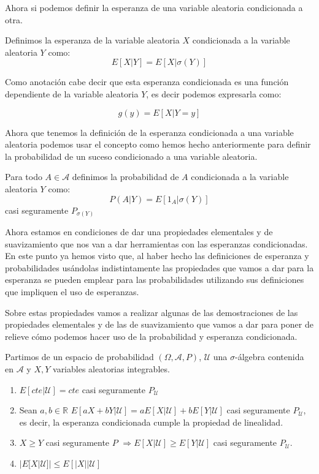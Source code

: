Ahora si podemos definir la esperanza de una variable aleatoria condicionada a otra.

\begin{definicion}
	Definimos la esperanza de la variable aleatoria $X$ condicionada a la variable aleatoria $Y$ como:
	$$E[X | Y] = E[X | \sigma (Y)]$$
\end{definicion}

Como anotación cabe decir que esta esperanza condicionada es una función dependiente de la variable aleatoria $Y$, es decir podemos expresarla como:

$$g(y) = E[X | Y=y]$$

Ahora que tenemos la definición de la esperanza condicionada a una variable aleatoria podemos usar el concepto como hemos hecho anteriormente para definir la probabilidad de un suceso condicionado a una variable aleatoria.

\begin{definicion}
	Para todo $A\in \mathcal{A}$ definimos la probabilidad de $A$ condicionada a la variable aleatoria $Y$ como:
	$$P(A | Y) = E[1_A | \sigma (Y)]$$
	casi seguramente $P_{\sigma (Y)}$
\end{definicion}

Ahora estamos en condiciones de dar una propiedades elementales y de suavizamiento que nos van a dar herramientas con las esperanzas condicionadas. En este punto ya hemos visto que, al haber hecho las definiciones de esperanza y probabilidades usándolas indistintamente las propiedades que vamos a dar para la esperanza se pueden emplear para las probabilidades utilizando sus definiciones que impliquen el uso de esperanzas.

Sobre estas propiedades vamos a realizar algunas de las demostraciones de las propiedades elementales y de las de suavizamiento que vamos a dar para poner de relieve cómo podemos hacer uso de la probabilidad y esperanza condicionada.

\begin{propiedades}
	Partimos de un espacio de probabilidad $(\Omega , \mathcal{A}, P)$, $\mathcal{U}$ una $\sigma$-álgebra contenida en $\mathcal{A}$ y $X,Y$ variables aleatorias integrables.
	\begin{enumerate}
		\item $E[cte | \mathcal{U}] = cte$ casi seguramente $P_{\mathcal{U}}$
		\item Sean $a, b \in \mathbb{R}$ $E[aX + bY | \mathcal{U}] = aE[X | \mathcal{U}] + bE[Y | \mathcal{U}]$ casi seguramente $P_{\mathcal{U}}$, es decir, la esperanza condicionada cumple la propiedad de linealidad.
		\item $X\geq Y$ casi seguramente $P$ $\Rightarrow E[X | \mathcal{U}] \geq E[Y | \mathcal{U}]$ casi seguramente $P_{\mathcal{U}}$.
		\item $|E[X | \mathcal{U}]| \leq  E[|X| |\mathcal{U}]$
	\end{enumerate}
\end{propiedades}

